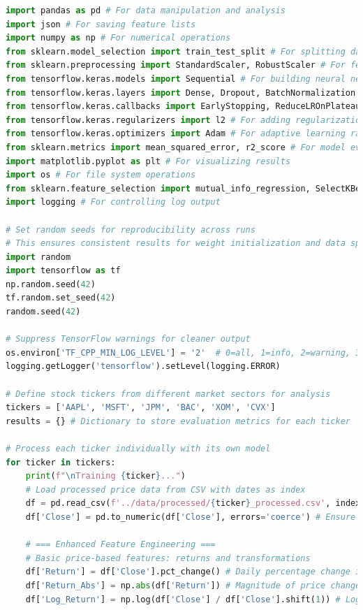 \documentclass[12pt]{article}
\begin{document}
\begin{lstlisting}[language=Python]
import pandas as pd # For data manipulation and analysis
import json # For saving feature lists
import numpy as np # For numerical operations
from sklearn.model_selection import train_test_split # For splitting data into train and test sets
from sklearn.preprocessing import StandardScaler, RobustScaler # For feature scaling
from tensorflow.keras.models import Sequential # For building neural network architecture
from tensorflow.keras.layers import Dense, Dropout, BatchNormalization # For network layers
from tensorflow.keras.callbacks import EarlyStopping, ReduceLROnPlateau, ModelCheckpoint # For optimizing training
from tensorflow.keras.regularizers import l2 # For adding regularization to reduce overfitting
from tensorflow.keras.optimizers import Adam # For adaptive learning rate optimization
from sklearn.metrics import mean_squared_error, r2_score # For model evaluation
import matplotlib.pyplot as plt # For visualizing results
import os # For file system operations
from sklearn.feature_selection import mutual_info_regression, SelectKBest # For information-based feature selection
import logging # For controlling log output

# Set random seeds for reproducibility across runs
# This ensures consistent results for weight initialization and data splitting
import random
import tensorflow as tf
np.random.seed(42)
tf.random.set_seed(42)
random.seed(42)

# Suppress TensorFlow warnings for cleaner output
os.environ['TF_CPP_MIN_LOG_LEVEL'] = '2'  # 0=all, 1=info, 2=warning, 3=error
logging.getLogger('tensorflow').setLevel(logging.ERROR)

# Define stock tickers from different market sectors for analysis
tickers = ['AAPL', 'MSFT', 'JPM', 'BAC', 'XOM', 'CVX']
results = {} # Dictionary to store evaluation metrics for each ticker

# Process each ticker individually with its own model
for ticker in tickers:
    print(f"\nTraining {ticker}...")
    # Load processed price data from CSV with dates as index
    df = pd.read_csv(f'../data/processed/{ticker}_processed.csv', index_col='Date', parse_dates=True)
    df['Close'] = pd.to_numeric(df['Close'], errors='coerce') # Ensure Close prices are numeric

    # === Enhanced Feature Engineering ===
    # Basic price-based features: returns and transformations
    df['Return'] = df['Close'].pct_change() # Daily percentage change in price
    df['Return_Abs'] = np.abs(df['Return']) # Magnitude of price changes (volatility indicator)
    df['Log_Return'] = np.log(df['Close'] / df['Close'].shift(1)) # Log returns for statistical properties
    

\end{lstlisting}
\end{document}
